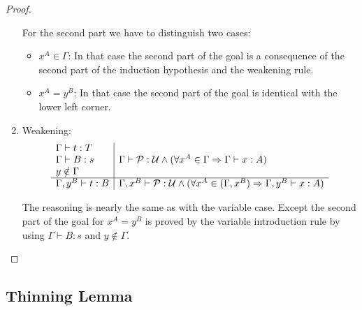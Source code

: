 \begin{theorem}
\begin{proof}
\begin{enumerate}
            For the second part we have to distinguish two cases:
            \begin{itemize}
            \item $x^A \in \Gamma$: In that case the second part of the goal is
                a consequence of the second part of the induction hypothesis and
                    the weakening rule.
            \item $x^A = y^B$: In that case the second part of the goal is
                identical with the lower left corner.
            \end{itemize}

        \item Weakening:
            $$
            \begin{array}{l|l}
                \Gamma \vdash t : T
                \\
                \Gamma \vdash B: s
                &
                \Gamma \vdash {\cal P} : {\cal U}
                \land
                (\forall x^A \in \Gamma \Rightarrow \Gamma \vdash x : A)
                \\
                y \notin \Gamma
                \\
                \hline
                \Gamma, y^B \vdash t: B
                &
                \Gamma, x^B \vdash {\cal P}:{\cal U}
                \land
                (\forall x^A \in (\Gamma, x^B) \Rightarrow \Gamma, y^B \vdash x : A)
            \end{array}
            $$

            The reasoning is nearly the same as with the variable case. Except
            the second part of the goal for $x^A = y^B$ is proved by the
            variable introduction rule by using $\Gamma \vdash B : s$ and $y
            \notin \Gamma$.
        \end{enumerate}
    \end{proof}
\end{theorem}




\subsection{Thinning Lemma}

